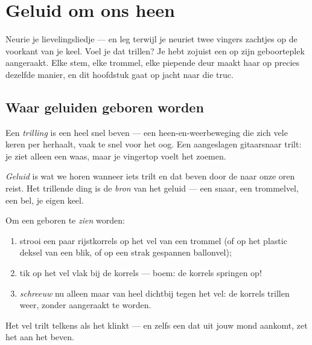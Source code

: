 \chapter{Geluid om ons heen}\label{ch:g3:sound-around-us}

Neurie je lievelingsliedje --- en leg terwijl je neuriet twee vingers
zachtjes op de voorkant van je keel. Voel je dat trillen? Je hebt zojuist
een  op zijn geboorteplek aangeraakt. Elke stem, elke trommel,
elke piepende deur maakt haar  op precies dezelfde manier, en dit
hoofdstuk gaat op jacht naar die truc.

\section{Waar geluiden geboren worden}

\begin{definition}[Trilling]\label{def:g3:sound-around-us:vibration}
Een \emph{trilling} is een heel snel beven --- een
heen-en-weerbeweging die zich vele keren per  herhaalt, vaak te
snel voor het oog. Een aangeslagen gitaarsnaar trilt: je ziet alleen
een waas, maar je vingertop voelt het zoemen.
\end{definition}

\begin{definition}[Geluid]\label{def:g3:sound-around-us:sound}
\emph{Geluid} is wat we horen wanneer iets trilt en dat
beven door de  naar onze oren reist. Het trillende ding is de
\emph{bron} van het geluid --- een snaar, een trommelvel, een bel, je
eigen keel.
\end{definition}

\begin{method}\label{met:g3:sound-around-us:rice}
Om een  geboren te \emph{zien} worden:
\begin{enumerate}
  \item strooi een paar rijstkorrels op het vel van een trommel (of op
        het plastic deksel van een blik, of op een strak gespannen
        ballonvel);
  \item tik op het vel vlak bij de korrels --- boem: de korrels
        springen op!
  \item \emph{schreeuw} nu alleen maar van heel dichtbij tegen het
        vel: de korrels trillen weer, zonder aangeraakt te worden.
\end{enumerate}
Het vel trilt telkens als het klinkt --- en zelfs een  dat uit
jouw mond aankomt, zet het aan het beven.
\end{method}

